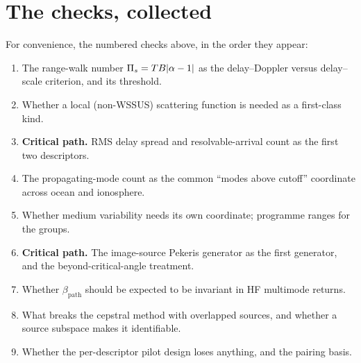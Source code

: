 \documentclass[11pt,a4paper]{article}
\begin{document}
\section*{The checks, collected}

For convenience, the numbered checks above, in the order they appear:
\begin{enumerate}[label=\textbf{Check \arabic*.},leftmargin=*]
\item The range-walk number $\Pi_{s}=TB|\alpha-1|$ as the delay--Doppler versus delay--scale criterion, and its threshold.
\item Whether a local (non-WSSUS) scattering function is needed as a first-class kind.
\item \textbf{Critical path.} RMS delay spread and resolvable-arrival count as the first two descriptors.
\item The propagating-mode count as the common ``modes above cutoff'' coordinate across ocean and ionosphere.
\item Whether medium variability needs its own coordinate; programme ranges for the groups.
\item \textbf{Critical path.} The image-source Pekeris generator as the first generator, and the beyond-critical-angle treatment.
\item Whether $\beta_{\mathrm{path}}$ should be expected to be invariant in HF multimode returns.
\item What breaks the cepstral method with overlapped sources, and whether a source subspace makes it identifiable.
\item Whether the per-descriptor pilot design loses anything, and the pairing basis.
\end{enumerate}



\end{document}
